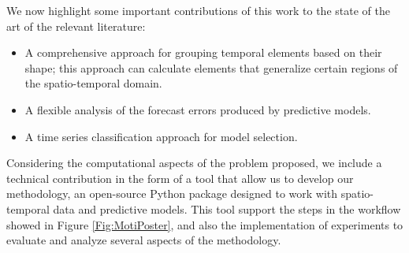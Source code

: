 We now highlight some important contributions of this work to the state of the art of the relevant literature:

\begin{itemize}
\item A comprehensive approach for grouping temporal elements based on their shape; this approach can calculate elements that generalize certain regions of the spatio-temporal domain. %


\item A flexible analysis of the forecast errors produced by predictive models. 

\item A time series classification approach for model selection. 
\end{itemize}

Considering the computational aspects of the problem proposed, we include a technical contribution in the form of a tool that allow us to develop our methodology, an open-source Python package designed to work with spatio-temporal data and predictive models. This tool support the steps in the workflow showed in Figure \ref{Fig:MotiPoster}, and also the implementation of experiments to evaluate and analyze several aspects of the methodology.

